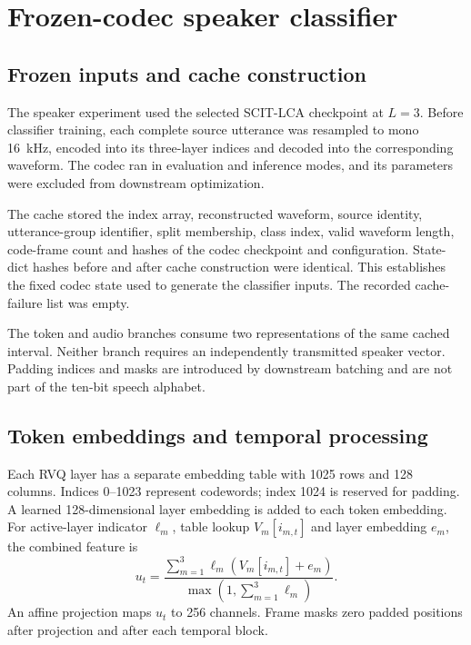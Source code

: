 \section{Frozen-codec speaker classifier}
\label{sec:sv2-speaker}

\subsection{Frozen inputs and cache construction}
The speaker experiment used the selected SCIT-LCA checkpoint at $L=3$. Before classifier training, each complete source utterance was resampled to mono 16~kHz, encoded into its three-layer indices and decoded into the corresponding waveform. The codec ran in evaluation and inference modes, and its parameters were excluded from downstream optimization.

The cache stored the index array, reconstructed waveform, source identity, utterance-group identifier, split membership, class index, valid waveform length, code-frame count and hashes of the codec checkpoint and configuration. State-dict hashes before and after cache construction were identical. This establishes the fixed codec state used to generate the classifier inputs. The recorded cache-failure list was empty.

The token and audio branches consume two representations of the same cached interval. Neither branch requires an independently transmitted speaker vector. Padding indices and masks are introduced by downstream batching and are not part of the ten-bit speech alphabet.

\subsection{Token embeddings and temporal processing}
Each RVQ layer has a separate embedding table with 1025 rows and 128 columns. Indices 0--1023 represent codewords; index 1024 is reserved for padding. A learned 128-dimensional layer embedding is added to each token embedding. For active-layer indicator $\ell_m$, table lookup $V_m[i_{m,t}]$ and layer embedding $e_m$, the combined feature is
\begin{equation}
 u_t=
 \frac{\sum_{m=1}^{3}\ell_m(V_m[i_{m,t}]+e_m)}
      {\max(1,\sum_{m=1}^{3}\ell_m)}.
 \label{eq:sv2-layer-mean}
\end{equation}
An affine projection maps $u_t$ to 256 channels. Frame masks zero padded positions after projection and after each temporal block.

